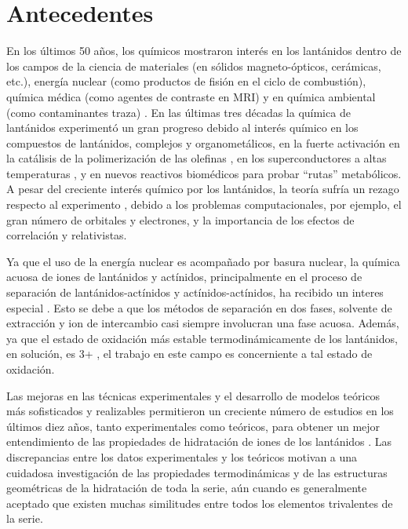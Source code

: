 \section{Antecedentes}
En los \'ultimos 50 a\~nos, los qu\'imicos mostraron inter\'es en los
lant\'anidos dentro de los campos de la ciencia de materiales (en 
s\'olidos magneto-\'opticos, cer\'amicas, etc.), energ\'ia nuclear 
(como productos de fisi\'on en el ciclo de combusti\'on), qu\'imica 
m\'edica (como agentes de contraste en MRI) y en qu\'imica ambiental 
(como contaminantes traza) \citep{Kuta2010}. En las \'ultimas tres 
d\'ecadas
la qu\'imica de lant\'anidos experiment\'o un gran progreso debido
al inter\'es qu\'imico en los compuestos de lant\'anidos, complejos
y organomet\'alicos, en la fuerte activaci\'on en la cat\'alisis de 
la polimerizaci\'on de las olefinas \citep{Jesk1985}, en los 
superconductores a altas temperaturas \citep{Rao1989}, y en nuevos 
reactivos biom\'edicos para probar ``rutas'' metab\'olicos. A pesar
del creciente inter\'es qu\'imico por los lant\'anidos, la teor\'ia 
sufr\'ia un rezago respecto al experimento \citep{Cund1993}, debido
a los problemas computacionales, por ejemplo, el gran n\'umero de 
orbitales y electrones, y la importancia de los efectos de 
correlaci\'on y relativistas.

Ya que el uso de la energ\'ia nuclear es acompa\~nado por basura 
nuclear, la qu\'imica acuosa de iones de lant\'anidos y act\'inidos,
principalmente en el proceso de separaci\'on de 
lant\'anidos-act\'inidos y act\'inidos-act\'inidos, ha recibido un 
interes especial \citep{Ciup2010}. Esto se debe a que los m\'etodos 
de separaci\'on en dos fases, solvente de extracci\'on y ion de 
intercambio casi siempre involucran una fase acuosa. Adem\'as, ya que
el estado de oxidaci\'on m\'as estable termodin\'amicamente de los 
lant\'anidos, en soluci\'on, es 3+ \citep{Bunz2006}, el trabajo en 
este campo es concerniente a tal estado de oxidaci\'on. 



Las mejoras en las t\'ecnicas experimentales y el desarrollo de 
modelos te\'oricos m\'as sofisticados y realizables permitieron un 
creciente n\'umero de estudios en los \'ultimos diez a\~nos, tanto 
experimentales como te\'oricos, para obtener un mejor entendimiento 
de las propiedades de hidrataci\'on de iones de los lant\'anidos 
\citep{Dang2012}. Las discrepancias entre los datos experimentales
y los te\'oricos motivan a una cuidadosa investigaci\'on de las 
propiedades termodin\'amicas y de las estructuras geom\'etricas de la
hidrataci\'on de toda la serie, a\'un cuando es generalmente aceptado
que existen muchas similitudes entre todos los elementos trivalentes
de la serie.

